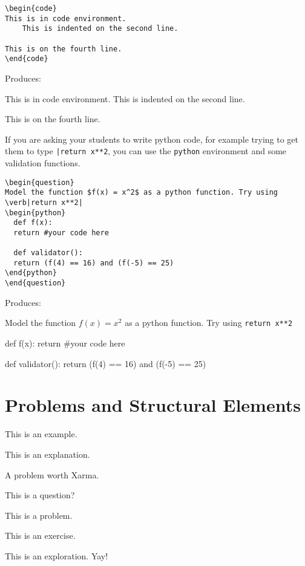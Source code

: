 \documentclass{ximera}
\begin{document}
\begin{verbatim}
\begin{code}
This is in code environment.
    This is indented on the second line.

This is on the fourth line.
\end{code}
\end{verbatim}

Produces:

\begin{code}
This is in code environment.
    This is indented on the second line.

This is on the fourth line.
\end{code}

If you are asking your students to write python code, for example trying to get them to type \verb!|return x**2!, you can use the \verb!python! environment and some validation functions.

\begin{verbatim}
\begin{question}
Model the function $f(x) = x^2$ as a python function. Try using \verb|return x**2|
\begin{python}
  def f(x):
  return #your code here

  def validator():
  return (f(4) == 16) and (f(-5) == 25)
\end{python}
\end{question}
\end{verbatim}

Produces:

\begin{question}
Model the function $f(x) = x^2$ as a python function. Try using \verb|return x**2|
\begin{python}
  def f(x):
  return #your code here

  def validator():
  return (f(4) == 16) and (f(-5) == 25)
\end{python}
\end{question}


\section{Problems and Structural Elements}

\begin{example}
This is an example.
\end{example}
\begin{explanation}
This is an explanation.
\end{explanation}
\begin{xarmaBoost}
A problem worth Xarma.
\end{xarmaBoost}
\begin{question}
This is a question?
\end{question}
\begin{problem}
This is a problem.
\end{problem}
\begin{exercise}
This is an exercise.
\end{exercise}
\begin{exploration}
This is an exploration. Yay!
\end{exploration}
\end{document}
